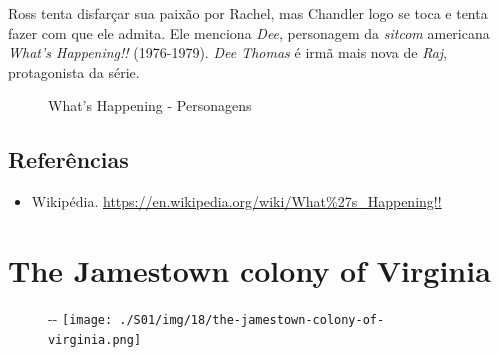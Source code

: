 Ross tenta disfarçar sua paixão por Rachel, mas Chandler logo se toca e
tenta fazer com que ele admita. Ele menciona \emph{Dee}, personagem da
\emph{sitcom} americana \emph{What's Happening!!} (1976-1979). \emph{Dee
Thomas} é irmã mais nova de \emph{Raj}, protagonista da série.

\begin{figure}
  \centering
    \caption{What’s Happening - Personagens\label{fig:what-s-happening-personagens}}
\end{figure}

\hypertarget{referuxeancias-3}{%
\subsection{Referências}\label{referuxeancias-3}}

\begin{itemize}
\tightlist
\item
  \sloppy Wikipédia. \url{https://en.wikipedia.org/wiki/What%27s_Happening!!}
\end{itemize}

\hypertarget{the-jamestown-colony-of-virginia}{%
\section{The Jamestown colony of
Virginia}\label{the-jamestown-colony-of-virginia}}

\begin{figure}[!ht]
  \begin{adjustwidth}{-\oddsidemargin-1in}{-\rightmargin}
    \centering
    \texttt{[image: ./S01/img/18/the-jamestown-colony-of-virginia.png]}
  \end{adjustwidth}
\end{figure}

